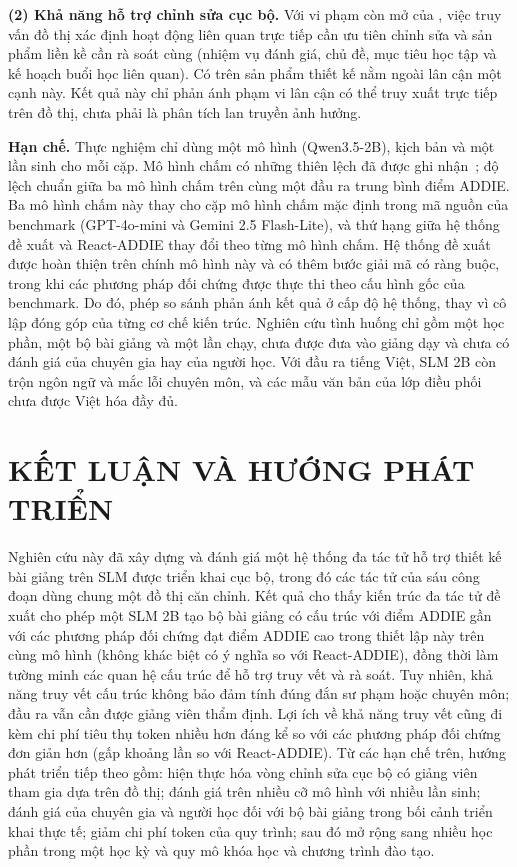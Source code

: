 \documentclass[conference,a4paper]{IEEEtran}
\begin{document}
\textbf{(2) Khả năng hỗ trợ chỉnh sửa cục bộ.} Với vi phạm còn mở của \caseLocalObjective, việc
truy vấn đồ thị xác định \caseLocalRewrite{} hoạt động liên quan trực tiếp cần ưu tiên chỉnh sửa và
\caseLocalCheck{} sản phẩm liền kề cần rà soát cùng (nhiệm vụ đánh giá, chủ đề, mục tiêu học tập và
kế hoạch buổi học liên quan). Có \caseLocalOutside{} trên \caseDesign{} sản phẩm thiết kế nằm ngoài lân cận một cạnh này. Kết quả này
chỉ phản ánh phạm vi lân cận có thể truy xuất trực tiếp trên đồ thị, chưa phải là phân tích lan
truyền ảnh hưởng.

\textbf{Hạn chế.} Thực nghiệm chỉ dùng một mô hình (Qwen3.5-2B), \NScen{} kịch bản và một lần sinh cho mỗi
cặp. Mô hình chấm có những thiên lệch đã được ghi nhận~\cite{ye2025justice}; độ lệch chuẩn giữa ba mô hình chấm trên
cùng một đầu ra trung bình \JudgeSD{} điểm ADDIE. Ba mô hình chấm này thay cho cặp mô hình chấm mặc
định trong mã nguồn của benchmark (GPT-4o-mini và Gemini 2.5 Flash-Lite), và thứ hạng giữa hệ thống đề xuất và
React-ADDIE thay đổi theo từng mô hình chấm. Hệ thống đề xuất được hoàn thiện trên chính mô hình này và có
thêm bước giải mã có ràng buộc, trong khi các phương pháp đối chứng được thực thi theo cấu hình gốc của
benchmark. Do đó, phép so sánh
phản ánh kết quả ở cấp độ hệ thống, thay vì cô lập đóng góp của từng cơ chế kiến trúc. Nghiên cứu tình huống chỉ gồm một học phần, một bộ bài giảng và một lần chạy, chưa được đưa vào giảng dạy và chưa có
đánh giá của chuyên gia hay của người học. Với đầu ra tiếng Việt, SLM 2B còn trộn ngôn ngữ và
mắc lỗi chuyên môn, và các mẫu văn bản của lớp điều phối chưa được Việt hóa đầy đủ.

\section{KẾT LUẬN VÀ HƯỚNG PHÁT TRIỂN}
\label{sec:conclusion}

Nghiên cứu này đã xây dựng và đánh giá một hệ thống đa tác tử hỗ trợ thiết kế bài giảng trên SLM
được triển khai cục bộ, trong đó các tác tử của sáu công đoạn dùng chung một đồ thị căn chỉnh. Kết
quả cho thấy kiến trúc đa tác tử đề xuất cho phép một SLM 2B tạo bộ bài giảng có cấu trúc với điểm ADDIE
gần với các phương pháp đối chứng đạt điểm ADDIE cao trong thiết lập này trên cùng mô hình (không khác biệt có ý nghĩa so với
React-ADDIE), đồng thời làm tường minh các quan hệ cấu trúc để hỗ trợ truy vết và rà soát. Tuy nhiên,
khả năng truy vết cấu trúc không bảo đảm tính đúng đắn sư phạm hoặc chuyên môn; đầu ra vẫn cần được
giảng viên thẩm định. Lợi ích về khả năng truy vết cũng đi kèm chi phí tiêu thụ token nhiều hơn đáng kể so
với các phương pháp đối chứng đơn giản hơn (gấp khoảng \cmpTokRatioReact{} lần so với React-ADDIE). Từ các hạn chế
trên, hướng phát triển tiếp theo gồm: hiện thực hóa vòng chỉnh sửa cục bộ có giảng viên tham gia dựa trên
đồ thị; đánh giá trên nhiều cỡ mô hình với nhiều lần sinh; đánh giá của chuyên gia và người học
đối với bộ bài giảng trong bối cảnh triển khai thực tế; giảm chi phí token của quy trình; sau đó mở
rộng sang nhiều học phần trong một học kỳ và quy mô khóa học và chương trình đào tạo.



\end{document}

